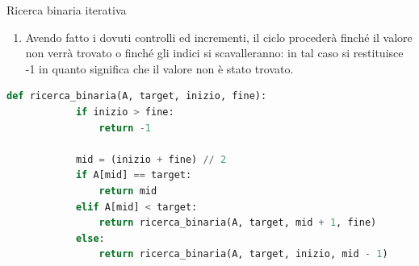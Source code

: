 \documentclass[12pt]{report}
\begin{document}
\begin{algoritmo}{Ricerca binaria iterativa}{}
\begin{enumerate}
\begin{enumerate}
    			\item Se il valore all’indice mid è maggiore di quello che stiamo cercando, dato che l’array è ordinato, significa che dovremo cercare nella metà sinistra dell’array. Proceduralmente questo si traduce decrementando il valore di  fine (ricordiamo che fine è l’indice che rappresenta la fine della sequenza che stiamo considerando). Impostiamo il nuovo indice di fine a mid -1 (chiaramente non a mid, dato che il valore nell’indice mid l’abbiamo già considerato nella prima condizione).

    		\end{enumerate}
    				
    		\item Avendo fatto i dovuti controlli ed incrementi, il ciclo procederà finché il valore non verrà trovato o finché gli indici si scavalleranno: in tal caso si restituisce -1 in quanto significa che il valore non è stato trovato.

    	\end{enumerate}
    			
    \end{algoritmo}
    		
    \begin{lstlisting}[caption={Versione ricorsiva della ricerca binaria}, language=Python]
    	def ricerca_binaria(A, target, inizio, fine):
    		if inizio > fine:
    			return -1
    		
    		mid = (inizio + fine) // 2
    		if A[mid] == target:
    			return mid
    		elif A[mid] < target:
    			return ricerca_binaria(A, target, mid + 1, fine)
    		else:
    			return ricerca_binaria(A, target, inizio, mid - 1)
    \end{lstlisting}
    		
\end{document}

